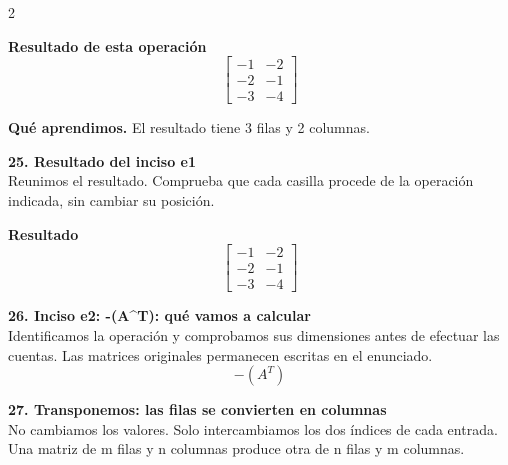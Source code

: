 \documentclass[11pt,a4paper,landscape]{article}
\begin{document}
\begin{multicols*}{2}
\begin{minipage}{\linewidth}
\par\smallskip \textbf{Resultado de esta operación}\[\begin{bmatrix}-1 & -2\\-2 & -1\\-3 & -4\end{bmatrix}\]
\par\smallskip\textbf{Qué aprendimos.} El resultado tiene 3 filas y 2 columnas.
\end{minipage}\par\medskip
\noindent\begin{minipage}{\linewidth}\textbf{25. Resultado del inciso e1}\\[2pt]Reunimos el resultado. Comprueba que cada casilla procede de la operación indicada, sin cambiar su posición.
\par\smallskip \textbf{Resultado}\[\begin{bmatrix}-1 & -2\\-2 & -1\\-3 & -4\end{bmatrix}\]
\end{minipage}\par\medskip
\noindent\begin{minipage}{\linewidth}\textbf{26. Inciso e2: -(A\textasciicircum{}T): qué vamos a calcular}\\[2pt]Identificamos la operación y comprobamos sus dimensiones antes de efectuar las cuentas. Las matrices originales permanecen escritas en el enunciado.
\[-(A^T)\]
\end{minipage}\par\medskip
\noindent\begin{minipage}{\linewidth}\textbf{27. Transponemos: las filas se convierten en columnas}\\[2pt]No cambiamos los valores. Solo intercambiamos los dos índices de cada entrada. Una matriz de m filas y n columnas produce otra de n filas y m columnas.
\par{}\par\smallskip

\end{minipage}
\end{multicols*}
\end{document}
